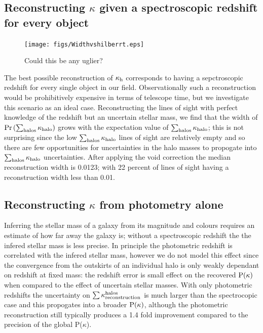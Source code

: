 \documentclass[useAMS,usenatbib]{mn2e}
\begin{document}
\subsection{Reconstructing $\kappa$ given a spectroscopic redshift for every object}

\begin{figure}
\texttt{[image: figs/Widthvshilberrt.eps]}
\caption[magcut]{Could this be any uglier?}
\label{fig:reconidths}
\end{figure}

The best possible reconstruction of $\kappa_{\rm h}$ corresponds to having a sepctroscopic redshift for every single object in our field. Observationally such a reconstruction would be prohibitively expensive in terms of telescope time, but we investigate this scenario as an ideal case. Reconstructing the lines of sight with perfect knowledge of the redshift but an uncertain stellar mass, we find that the width of ${\rm Pr}\left(\sum_{\rm halos} \kappa_{\rm halo} \right)$ grows with the expectation value of $\sum_{\rm halos} \kappa_{\rm halo}$; this is not surprising since the low $\sum_{\rm halos} \kappa_{\rm halo}$ lines of sight are relatively empty and so there are few opportunities for uncertainties in the halo masses to propogate into $\sum_{\rm halos} \kappa_{\rm halo}$ uncertainties. After applying the void correction the median reconstruction width is 0.0123; with 22 percent of lines of sight having a reconstruction width less than 0.01. 

\subsection{Reconstructing $\kappa$ from photometry alone}

Inferring the stellar mass of a galaxy from its magnitude and colours requires an estimate of how far away the galaxy is; without a spectroscopic redshift the the infered stellar mass is less precise. In principle the photometric redshift is correlated with the infered stellar mass, however we do not model this effect since the convergence from the outskirts of an individual halo is only weakly dependant on redshift at fixed mass: the redshift error is small effect on the recovered ${\rm P}(\kappa)$ when compared to the effect of uncertain stellar masses.  With only photometric redshifts the uncertainty on $\sum\kappa_{\rm reconstruction}^{\rm halos}$ is much larger than the spectrocopic case and this propogates into a broader ${\rm P}(\kappa)$, although the photometric reconstruction still typically produces a 1.4 fold improvement compared to the precision of the global P($\kappa$).
\end{document}
